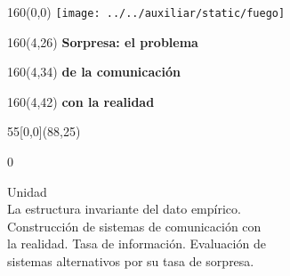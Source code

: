 \documentclass[shownotes,aspectratio=169]{beamer}
\newcounter{capitulo}
\newcommand{\unidad}{\thecapitulo \stepcounter{capitulo}}
\begin{document}
\begin{frame}

\begin{textblock}{160}(0,0)
\texttt{[image: ../../auxiliar/static/fuego]}
\end{textblock}

\begin{textblock}{160}(4,26)
\LARGE \textcolor{black!5}{\fontsize{22}{0}\selectfont \textbf{Sorpresa: el problema}}
\end{textblock}
\begin{textblock}{160}(4,34)
\LARGE \textcolor{black!5}{\fontsize{22}{0}\selectfont \textbf{de la comunicación}}
\end{textblock}
\begin{textblock}{160}(4,42)
\LARGE \textcolor{black!5}{\fontsize{22}{0}\selectfont \textbf{con la realidad}}
\end{textblock}


\begin{textblock}{55}[0,0](88,25)
\begin{turn}{0}
\parbox{7cm}{\sloppy\setlength\parfillskip{0pt}
\textcolor{black!0}{Unidad \unidad} \\
\small\textcolor{black!5}{\hspace{-0.3cm}La estructura invariante del dato empírico.} \\
\small\textcolor{black!5}{\hspace{-0.3cm}Construcción de sistemas de comunicación con}\\
\small\textcolor{black!5}{\hspace{-0.4cm}la realidad. Tasa de información. Evaluación de} \\
\small\textcolor{black!5}{\hspace{-0.6cm}sistemas alternativos por su tasa de sorpresa.} \\
}
\end{turn}
\end{textblock}


\end{frame}
\end{document}
